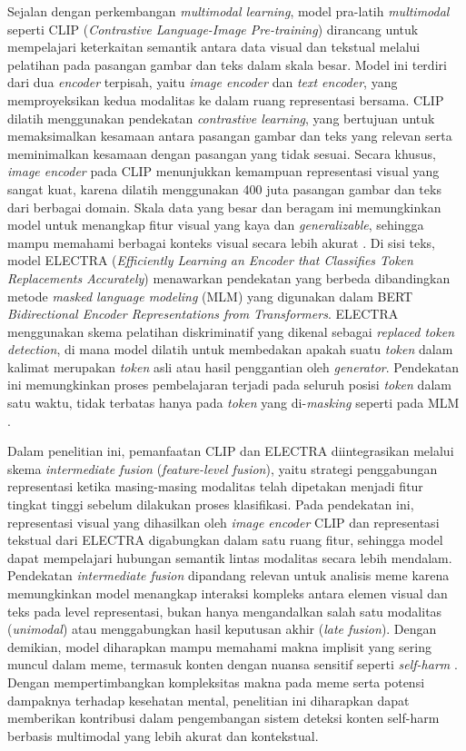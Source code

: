 Sejalan dengan perkembangan \textit{multimodal learning}, model pra-latih \textit{multimodal} seperti CLIP (\textit{Contrastive Language-Image Pre-training}) dirancang untuk mempelajari keterkaitan semantik antara data visual dan tekstual melalui pelatihan pada pasangan gambar dan teks dalam skala besar. Model ini terdiri dari dua \textit{encoder} terpisah, yaitu \textit{image encoder} dan \textit{text encoder}, yang memproyeksikan kedua modalitas ke dalam ruang representasi bersama. CLIP dilatih menggunakan pendekatan \textit{contrastive learning}, yang bertujuan untuk memaksimalkan kesamaan antara pasangan gambar dan teks yang relevan serta meminimalkan kesamaan dengan pasangan yang tidak sesuai. Secara khusus, \textit{image encoder} pada CLIP menunjukkan kemampuan representasi visual yang sangat kuat, karena dilatih menggunakan 400 juta pasangan gambar dan teks dari berbagai domain. Skala data yang besar dan beragam ini memungkinkan model untuk menangkap fitur visual yang kaya dan \textit{generalizable}, sehingga mampu memahami berbagai konteks visual secara lebih akurat \cite{radford2021clip}. Di sisi teks, model ELECTRA (\textit{Efficiently Learning an Encoder that Classifies Token Replacements Accurately}) menawarkan pendekatan yang berbeda dibandingkan metode \textit{masked language modeling} (MLM) yang digunakan dalam BERT \textit{Bidirectional Encoder Representations from Transformers}. ELECTRA menggunakan skema pelatihan diskriminatif yang dikenal sebagai \textit{replaced token detection}, di mana model dilatih untuk membedakan apakah suatu \textit{token} dalam kalimat merupakan \textit{token} asli atau hasil penggantian oleh \textit{generator}. Pendekatan ini memungkinkan proses pembelajaran terjadi pada seluruh posisi \textit{token} dalam satu waktu, tidak terbatas hanya pada \textit{token} yang di-\textit{masking} seperti pada MLM \cite{clark2020electra}. 

Dalam penelitian ini, pemanfaatan CLIP dan ELECTRA  diintegrasikan melalui skema \textit{intermediate fusion} (\textit{feature-level fusion}), yaitu strategi penggabungan representasi ketika masing-masing modalitas telah dipetakan menjadi fitur tingkat tinggi sebelum dilakukan proses klasifikasi. Pada pendekatan ini, representasi visual yang dihasilkan oleh \textit{image encoder} CLIP dan representasi tekstual dari ELECTRA digabungkan dalam satu ruang fitur, sehingga model dapat mempelajari hubungan semantik lintas modalitas secara lebih mendalam. Pendekatan \textit{intermediate fusion} dipandang relevan untuk analisis meme karena memungkinkan model menangkap interaksi kompleks antara elemen visual dan teks pada level representasi, bukan hanya mengandalkan salah satu modalitas (\textit{unimodal}) atau menggabungkan hasil keputusan akhir (\textit{late fusion}). Dengan demikian, model diharapkan mampu memahami makna implisit yang sering muncul dalam meme, termasuk konten dengan nuansa sensitif seperti \textit{self-harm} \cite{boulahia2021fusion}. Dengan mempertimbangkan kompleksitas makna pada meme serta potensi dampaknya terhadap kesehatan mental, penelitian ini diharapkan dapat memberikan kontribusi dalam pengembangan sistem deteksi konten self-harm berbasis multimodal yang lebih akurat dan kontekstual.

